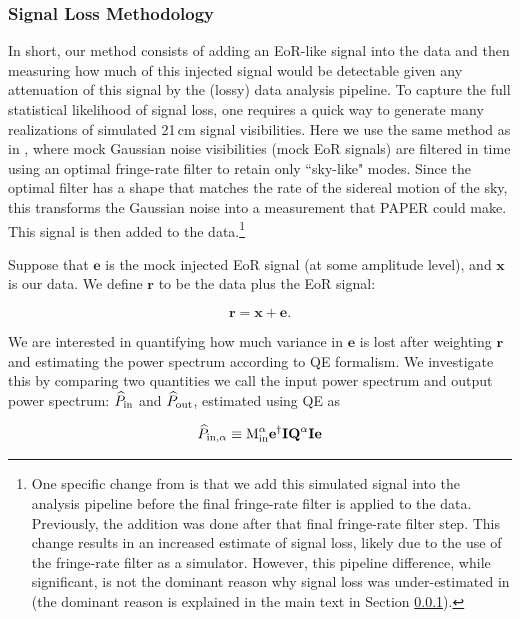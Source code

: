 \documentclass[preprint2,numberedappendix,tighten]{aastex6}  %
\begin{document}
\subsubsection{Signal Loss Methodology} 
\label{sec:siglossmethod}
In short, our method consists of adding an EoR-like signal into the data and then measuring how much of this injected signal would be detectable given any attenuation of this signal by the (lossy) data analysis pipeline.  To capture the full statistical likelihood of signal loss, one requires a quick way to generate many realizations of simulated 21\,cm signal visibilities. Here we use the same method as in , where mock Gaussian noise visibilities (mock EoR signals) 
are filtered in time using an optimal fringe-rate filter to retain only ``sky-like" modes. Since the optimal filter has a shape that matches the rate of the sidereal motion of the sky, this transforms the Gaussian noise into a measurement that PAPER could make. This signal is then added to the data.\footnote{One 
specific change from  is that we add this simulated signal into the analysis pipeline before the final fringe-rate filter is 
applied to the data. Previously, the addition was done after that final fringe-rate filter step.  This change results in an increased 
estimate of signal loss, %
likely due to the use of the fringe-rate filter as a simulator. However, this pipeline difference, while significant, is not the dominant reason why signal loss was under-estimated in  (the dominant reason is explained in the main text in Section \ref{sec:siglossmethod}).}

Suppose that $\textbf{e}$ is the mock injected EoR signal (at some amplitude level), and $\textbf{x}$ is our data. We define $\textbf{r}
$ to be the data plus the EoR signal:

\begin{equation}
\label{eq:rxe}
\textbf{r} = \textbf{x} + \textbf{e}.
\end{equation}

We are interested in quantifying how much variance in $\textbf{e}$ is lost after weighting $\textbf{r}$ and estimating the power 
spectrum according to QE formalism. We investigate this by comparing two quantities we call the input power spectrum and 
output power spectrum: $\widehat{P}_{\rm in}$ and $\widehat{P}_{\rm out}$, estimated using QE as

\begin{equation}
\label{eq:Pin}
\widehat{P}_{\rm in,\alpha} \equiv \text{M}^{\alpha}_{\rm in}\textbf{e}^{\dagger}\textbf{I}\textbf{Q}^{\alpha}\textbf{I}\textbf{e}
\end{equation}
\end{document}
